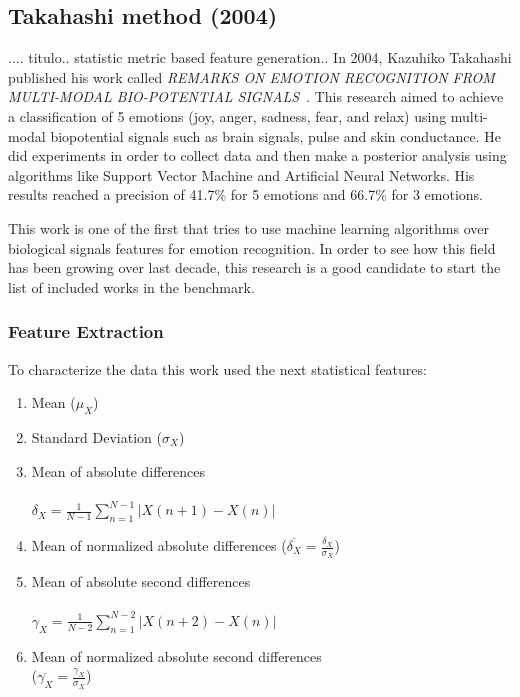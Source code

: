 \documentclass{sig-alternate}
\begin{document}
\subsection{Takahashi method (2004)}	
.... titulo.. statistic metric based feature generation..
In 2004, Kazuhiko Takahashi published his work called 
\textit{REMARKS ON EMOTION RECOGNITION FROM MULTI-MODAL BIO-POTENTIAL SIGNALS}~\cite{takahashi2004}. This 
research aimed to achieve a classification of 5 emotions (joy, anger, sadness, fear, and relax)
using multi-modal biopotential signals such as brain signals, pulse and skin conductance. He
 did experiments in order to collect data and then make a posterior analysis using algorithms
 like Support Vector Machine and Artificial Neural Networks. His results reached a precision of
 41.7\% for 5 emotions and 66.7\% for 3 emotions. 

This work is one of the first that tries to use machine learning algorithms
 over biological signals features for emotion recognition. In order to see
 how this field has been growing over last decade, this research is a good
 candidate to start the list of included works in the benchmark.  

\subsubsection{Feature Extraction}

To characterize the data this work used the next statistical features:
\begin{enumerate}
\item Mean ($\mu_{X}$)
\item Standard Deviation ($\sigma_{X}$)
\item Mean of absolute differences \\ \\ $\delta_{X} = \frac{1}{N-1} \sum^{N-1}_{n=1}|X(n+1)-X(n)|$
\item Mean of normalized absolute differences ($\overline{\delta_{X}} = \frac{\delta_{X}}{\sigma_{X}}$)
\item Mean of absolute second differences \\ \\ $\gamma_{X} = \frac{1}{N-2} \sum^{N-2}_{n=1}|X(n+2)-X(n)|$
\item Mean of normalized absolute second differences \\ ($\overline{\gamma_{X}} = \frac{\gamma_{X}}{\sigma_{X}}$)
\end{enumerate}  
\end{document}
